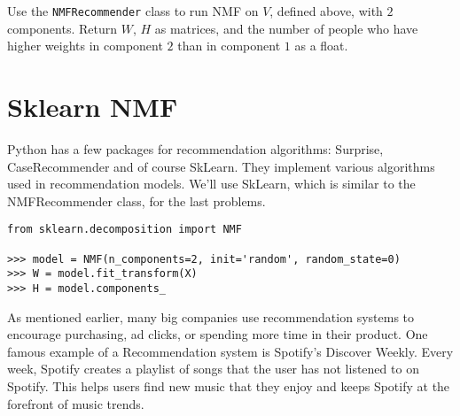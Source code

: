 \begin{problem}
Use the \texttt{NMFRecommender}  class to run NMF on $V$, defined above, with $2$ components.
Return $W$, $H$ as matrices, and the number of people who have higher weights in component $2$ than in component $1$ as a float.
\end{problem}

\section*{Sklearn NMF}
Python has a few packages for recommendation algorithms: Surprise, CaseRecommender and of course SkLearn.
They implement various algorithms used in recommendation models.
We'll use SkLearn, which is similar to the NMFRecommender class, for the last problems.


\begin{lstlisting}
from sklearn.decomposition import NMF

>>> model = NMF(n_components=2, init='random', random_state=0)
>>> W = model.fit_transform(X)
>>> H = model.components_
\end{lstlisting}

As mentioned earlier, many big companies use recommendation systems to encourage purchasing, ad clicks, or spending more time in their product.
One famous example of a Recommendation system is Spotify's Discover Weekly.
Every week, Spotify creates a playlist of songs that the user has not listened to on Spotify.
This helps users find new music that they enjoy and keeps Spotify at the forefront of music trends.

